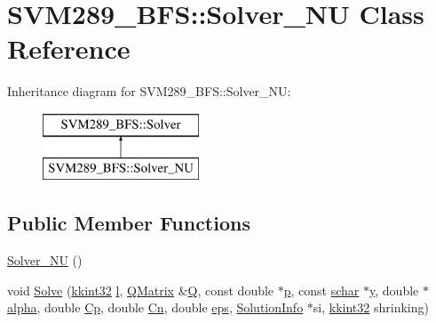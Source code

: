 \hypertarget{class_s_v_m289___b_f_s_1_1_solver___n_u}{}\section{S\+V\+M289\+\_\+\+B\+FS\+:\+:Solver\+\_\+\+NU Class Reference}
\label{class_s_v_m289___b_f_s_1_1_solver___n_u}
Inheritance diagram for S\+V\+M289\+\_\+\+B\+FS\+:\+:Solver\+\_\+\+NU\+:\begin{figure}[H]
\begin{center}
\leavevmode
\includegraphics[height=2.000000cm]{class_s_v_m289___b_f_s_1_1_solver___n_u}
\end{center}
\end{figure}
\subsection*{Public Member Functions}
\begin{DoxyCompactItemize}
\item 
\hyperlink{class_s_v_m289___b_f_s_1_1_solver___n_u_a83ad0fd05b08043fb77e7d895efc3b6d}{Solver\+\_\+\+NU} ()
\item 
void \hyperlink{class_s_v_m289___b_f_s_1_1_solver___n_u_a90214597a5a2a7ed797ee994f25e1b54}{Solve} (\hyperlink{namespace_k_k_b_a8fa4952cc84fda1de4bec1fbdd8d5b1b}{kkint32} \hyperlink{class_s_v_m289___b_f_s_1_1_solver_af63e60689ab3dd865e76e2c1d35db148}{l}, \hyperlink{class_s_v_m289___b_f_s_1_1_q_matrix}{Q\+Matrix} \&\hyperlink{class_s_v_m289___b_f_s_1_1_solver_ae0494fb6f65df63e46d76059ef07e3ec}{Q}, const double $\ast$\hyperlink{class_s_v_m289___b_f_s_1_1_solver_a4c3032a9c43561e743ba7a807ab1c1c7}{p}, const \hyperlink{namespace_s_v_m289___b_f_s_a67b51ac46a91cdb7ad72dea9fad6c0f0}{schar} $\ast$\hyperlink{class_s_v_m289___b_f_s_1_1_solver_ab6e1027acd321351163e02445ac37a48}{y}, double $\ast$\hyperlink{class_s_v_m289___b_f_s_1_1_solver_a8a95f4c9f0b029661c53d858534c0408}{alpha}, double \hyperlink{class_s_v_m289___b_f_s_1_1_solver_a7bae981240155350227523f2bd08ee87}{Cp}, double \hyperlink{class_s_v_m289___b_f_s_1_1_solver_ad0dd3ddc87834e0b9dbe7d2132a440ea}{Cn}, double \hyperlink{class_s_v_m289___b_f_s_1_1_solver_abb1bb8ca9d36e39da8cc535b4b49b57c}{eps}, \hyperlink{struct_s_v_m289___b_f_s_1_1_solver_1_1_solution_info}{Solution\+Info} $\ast$si, \hyperlink{namespace_k_k_b_a8fa4952cc84fda1de4bec1fbdd8d5b1b}{kkint32} shrinking)
\end{DoxyCompactItemize}
